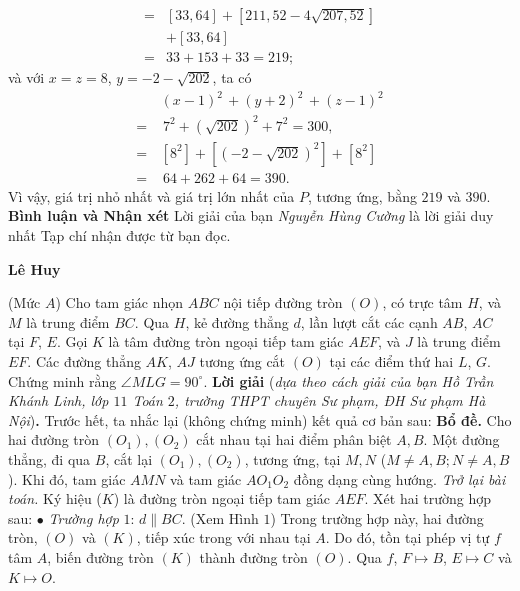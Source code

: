\begin{multicols}{2}
\begin{align*}
		=& \left[ {33,64} \right] + \left[ {211,52 - 4\sqrt {207,52} } \right] \\[-0.3ex]
		&+ \left[ {33,64} \right]\\[-0.3ex]
		=& 33 + 153 + 33 = 219;
	\end{align*}
	và với  $x=z = 8$, $y = -2-\sqrt{202}$,  ta có
	\begin{align*}
		&{\left( {x - 1} \right)^2}\, + {\left( {y + 2} \right)^2}\, + {\left( {z - 1} \right)^2}\\
		 = \,&\,{7^2} + {\left( {\sqrt {202} } \right)^2} + {7^2} = 300,\\
		= \,&\left[ {{8^2}} \right] + \left[ {{{\left( { - 2 - \sqrt {202} } \right)}^2}} \right] + \left[ {{8^2}} \right]\\
		= \,&\,64 + 262 + 64 = 390.
	\end{align*}
	Vì vậy, giá trị nhỏ nhất và giá trị lớn nhất của $P$, tương ứng, bằng $219$ và $390$.
	\vskip 0.05cm
	\textbf{\color{thachthuctoanhoc}Bình luận và Nhận xét}
	\vskip 0.05cm
	Lời giải của bạn \textit{Nguyễn Hùng Cường} là lời giải duy nhất Tạp chí nhận được từ bạn đọc.
	\begin{flushright}
		\textbf{\color{thachthuctoanhoc}Lê Huy}
	\end{flushright}
	{}
	(Mức $A$) Cho tam giác nhọn $ABC$ nội tiếp đường tròn $(O)$, có trực tâm $H$, và $M$ là trung điểm $BC$. Qua $H$, kẻ đường thẳng $d$, lần lượt cắt các cạnh $AB$, $AC$ tại $F$, $E$. Gọi $K$ là tâm đường tròn ngoại tiếp tam giác $AEF$, và $J$ là trung điểm $EF$. Các đường thẳng $AK$, $AJ$ tương ứng cắt $(O)$ tại các điểm thứ hai $L$, $G$. Chứng minh rằng $\angle MLG = 90^\circ$.
	\vskip 0.05cm 
	\textbf{\color{thachthuctoanhoc}Lời giải} (\textit{dựa theo cách giải của bạn Hồ Trần Khánh Linh, lớp $11$ Toán $2$, trường THPT chuyên Sư phạm, ĐH Sư phạm Hà Nội})\textbf{\color{thachthuctoanhoc}.}
	\vskip 0.05cm
	Trước hết, ta nhắc lại (không chứng minh) kết quả cơ bản sau:
	\vskip 0.05cm
	\textbf{\color{thachthuctoanhoc}Bổ đề.} Cho hai đường tròn $(O_1), (O_2)$ cắt nhau tại hai điểm phân biệt $A, B$. Một đường thẳng, đi qua $B$, cắt lại $(O_1), (O_2)$, tương ứng, tại $M, N$ ($M \ne A, B; N \ne A, B$). Khi đó, tam giác $AMN$ và tam giác $AO_1O_2$  đồng dạng cùng hướng.
	\vskip 0.05cm
	\textit{Trở lại bài toán.}
	\vskip 0.05cm
	Ký hiệu ($K$) là đường tròn ngoại tiếp tam giác $AEF$.
	\vskip 0.05cm
	Xét hai trường hợp sau:
	\vskip 0.05cm
	$\bullet$ \textit{Trường hợp} $1$: $d \parallel BC$. (Xem Hình $1$)
	\vskip 0.05cm	
	Trong trường hợp này, hai đường tròn, $(O)$ và $(K)$, tiếp xúc trong với nhau tại $A$. Do đó, tồn tại phép vị tự $f$ tâm $A$, biến đường tròn $(K)$ thành đường tròn $(O)$. Qua $f$, $F \mapsto B$, $E \mapsto C$  và $K \mapsto O$.

\end{multicols}
